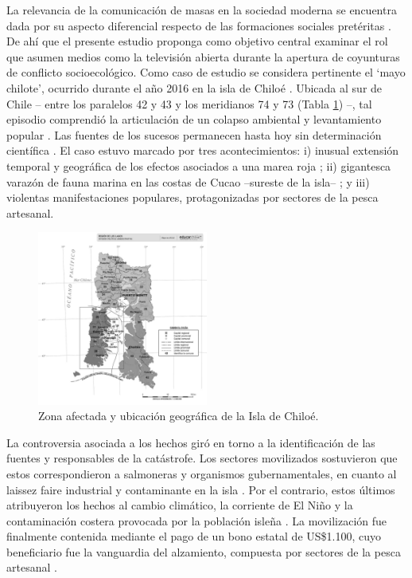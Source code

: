 \documentclass{textolivre}
\begin{document}
La relevancia de la comunicación de masas en la sociedad moderna se encuentra
dada por su aspecto diferencial respecto de las formaciones sociales pretéritas
\cite{Habermas2006}. De ahí que el presente estudio proponga como objetivo central
examinar el rol que asumen medios como la televisión abierta durante la apertura de
coyunturas de conflicto socioecológico. Como caso de estudio se considera pertinente el
‘mayo chilote’, ocurrido durante el año 2016 en la isla de Chiloé \cite{ValdebenitoAllendes2018}.
Ubicada al sur de Chile -- entre los paralelos 42 y 43 y los meridianos 74 y 73 (Tabla \ref{fig01})
--, tal episodio comprendió la articulación de un colapso ambiental y levantamiento
popular \cite{cabello2018,roman2016}. Las fuentes de los
sucesos permanecen hasta hoy sin determinación científica \cite{buschmann2016,t13b}. 
El caso estuvo marcado por tres acontecimientos: i) inusual extensión
temporal y geográfica de los efectos asociados a una marea roja \cite{burrows2016}; ii)
gigantesca varazón de fauna marina en las costas de Cucao --sureste de la isla-- \cite{cnnchile2016b}; 
y iii) violentas manifestaciones populares, protagonizadas por sectores de
la pesca artesanal.

\begin{figure}[htbp]
 \centering
 \includegraphics[width=0.5\textwidth]{figure001.pdf}
 \caption{Zona afectada y ubicación geográfica de la Isla de Chiloé.}
 \label{fig01}
\end{figure}

La controversia asociada a los hechos giró en torno a la identificación de las
fuentes y responsables de la catástrofe. Los sectores movilizados sostuvieron que estos
correspondieron a salmoneras y organismos gubernamentales, en cuanto al laissez faire
industrial y contaminante en la isla \cite{agenciaefe}. Por el contrario, estos últimos
atribuyeron los hechos al cambio climático, la corriente de El Niño y la contaminación
costera provocada por la población isleña \cite{infante2016,salmonexpert}. La
movilización fue finalmente contenida mediante el pago de un bono estatal de US\$1.100,
cuyo beneficiario fue la vanguardia del alzamiento, compuesta por sectores de la pesca
artesanal \cite{24horasb}.
\end{document}
